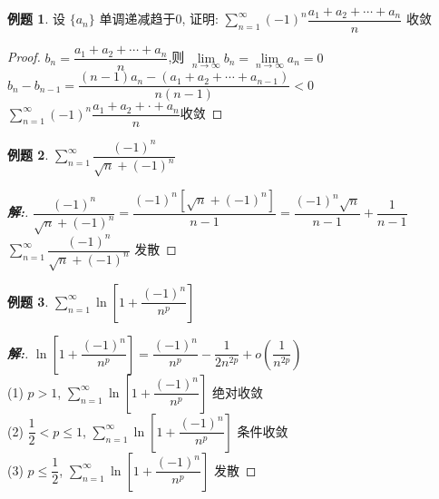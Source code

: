 \documentclass[12pt,a4paper]{ctexart}
\newenvironment{solution}{\begin{proof}[\hspace{2em}\textbf{解:}]}{\end{proof}}
\theoremstyle{definition}%
\newtheorem{exercise}{\hspace{2em}例题}
\begin{document}
\begin{exercise}
	设 $ \{a_n\} $ 单调递减趋于0, 证明: $ \displaystyle\sum_{n=1}^{\infty} (-1)^n \dfrac{a_1+a_2+\cdots+a_n}{n} $ 收敛
\end{exercise}
\begin{proof}
	$ b_n=\dfrac{a_1+a_2+\cdots+a_n}{n} $,则 $ \lim\limits_{n \to \infty}b_n=\lim\limits_{n \to \infty}a_n=0 $\\
	
	$ b_n-b_{n-1}=\dfrac{(n-1)a_n-(a_1+a_2+\cdots+a_{n-1})}{n(n-1)}<0 $\\
	
	$ \displaystyle\sum_{n=1}^{\infty}(-1)^n\dfrac{a_1+a_2+\cdot+a_n}{n} $收敛
\end{proof}

\begin{exercise}
	$ \displaystyle\sum_{n=1}^{\infty} \dfrac{(-1)^n}{\sqrt{n}+(-1)^n} $
\end{exercise}
\begin{solution}
	$ \dfrac{(-1)^n}{\sqrt{n}+(-1)^n}
	=\dfrac{(-1)^n[\sqrt{n}+(-1)^n]}{n-1}
	=\dfrac{(-1)^n\sqrt{n}}{n-1}+\dfrac{1}{n-1} $\\
	
	$ \displaystyle\sum_{n=1}^{\infty} \dfrac{(-1)^n}{\sqrt{n}+(-1)^n} $ 发散
\end{solution}

\begin{exercise}
	$ \displaystyle\sum_{n=1}^{\infty} \ln\left[1+\dfrac{(-1)^n}{n^p}\right] $
\end{exercise}
\begin{solution}
	$ \ln\left[1+\dfrac{(-1)^n}{n^p}\right]
	=\dfrac{(-1)^n}{n^p}-\dfrac{1}{2 n^{2p}}+o(\dfrac{1}{n^{2p}}) $\\
	
	(1) $ p>1 $, $ \displaystyle\sum_{n=1}^{\infty} \ln\left[1+\dfrac{(-1)^n}{n^p}\right] $ 绝对收敛\\
	
	(2) $ \dfrac{1}{2} < p \le 1 $, $ \displaystyle\sum_{n=1}^{\infty} \ln\left[1+\dfrac{(-1)^n}{n^p}\right] $ 条件收敛\\
	
	(3) $ p \le \dfrac{1}{2} $, $ \displaystyle\sum_{n=1}^{\infty} \ln\left[1+\dfrac{(-1)^n}{n^p}\right] $ 发散
	
\end{solution}
\end{document}

